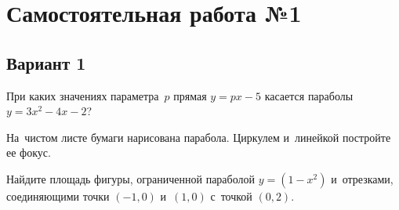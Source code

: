 
\section*{Самостоятельная работа №1}

\subsection*{Вариант 1}

\begin{problems}

\item
При каких значениях параметра~$p$ прямая $y = p x - 5$ касается параболы
\\
$y = 3 x^2 - 4 x - 2$?

\item
На~чистом листе бумаги нарисована парабола.
Циркулем и~линейкой постройте ее фокус.

\end{problems}

\vspace{-1.5ex}

\begin{minipage}[t][][b]{0.835\linewidth}
\begin{problems}
\item
Найдите площадь фигуры, ограниченной параболой \mbox{$y = (1 - x^2)$}
и~отрезками,
соединяющими точки $(-1, 0)$ и~$(1, 0)$ с~точкой $(0, 2)$.
\end{problems}
\end{minipage}
\hfill
\begin{minipage}[t][][b]{0.155\linewidth}
\end{minipage}

